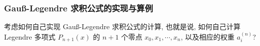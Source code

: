 
\begin{frame}
\frametitle{Gauß-Legendre 求积公式的实现与算例}

\begin{question}
考虑如何自己实现 Gauß-Legendre 求积公式的计算, 也就是说, 如何自己计算 Legendre 多项式 $P_{n+1}(x)$ 的 $n+1$ 个零点 $x_0, x_1, \cdots, x_n$, 以及相应的权重 $a_i^{(n)}$?
\end{question}

\end{frame}



